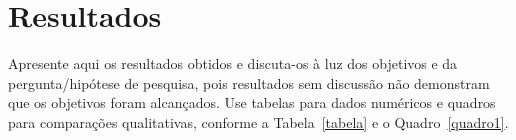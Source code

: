 \documentclass[tcc,capa]{texifsap}
\begin{document}
%
%
%

\chapter{Resultados}


Apresente aqui os resultados obtidos e discuta-os à luz dos objetivos e
da pergunta/hipótese de pesquisa, pois resultados sem discussão não
demonstram que os objetivos foram alcançados. Use tabelas para dados
numéricos e quadros para comparações qualitativas, conforme a
Tabela~\ref{tabela} e o Quadro~\ref{quadro1}.
\end{document}
